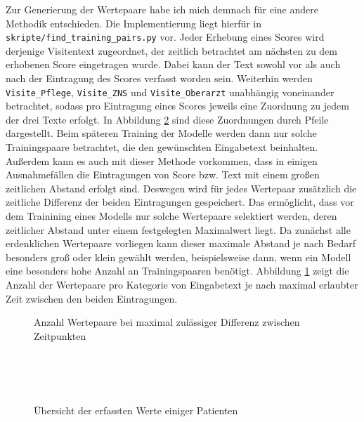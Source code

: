 Zur Generierung der Wertepaare habe ich mich demnach für eine andere Methodik entschieden. Die Implementierung liegt hierfür in \texttt{skripte/find\_training\_pairs.py} vor. Jeder Erhebung eines Scores wird derjenige Visitentext zugeordnet, der zeitlich betrachtet am nächsten zu dem erhobenen Score eingetragen wurde. Dabei kann der Text sowohl vor als auch nach der Eintragung des Scores verfasst worden sein. Weiterhin werden \texttt{Visite\_Pflege}, \texttt{Visite\_ZNS} und \texttt{Visite\_Oberarzt} unabhängig voneinander betrachtet, sodass pro Eintragung eines Scores jeweils eine Zuordnung zu jedem der drei Texte erfolgt. In Abbildung \ref{fig:pat_example_scatterplots} sind diese Zuordnungen durch Pfeile dargestellt. Beim späteren Training der Modelle werden dann nur solche Trainingspaare betrachtet, die den gewünschten Eingabetext beinhalten. Außerdem kann es auch mit dieser Methode vorkommen, dass in einigen Ausnahmefällen die Eintragungen von Score bzw. Text mit einem großen zeitlichen Abstand erfolgt sind. Deswegen wird für jedes Wertepaar zusätzlich die zeitliche Differenz der beiden Eintragungen gespeichert. Das ermöglicht, dass vor dem Trainining eines Modells nur solche Wertepaare selektiert werden, deren zeitlicher Abstand unter einem festgelegten Maximalwert liegt. Da zunächst alle erdenklichen Wertepaare vorliegen kann dieser maximale Abstand je nach Bedarf besonders groß oder klein gewählt werden, beispielsweise dann, wenn ein Modell eine besonders hohe Anzahl an Trainingspaaren benötigt. Abbildung \ref{fig:n_pairs_by_max_offset} zeigt die Anzahl der Wertepaare pro Kategorie von Eingabetext je nach maximal erlaubter Zeit zwischen den beiden Eintragungen.

\begin{figure}[htp]
    \captionsetup{justification=centering}
    \centering
    \quad
    \caption{Anzahl Wertepaare bei maximal zulässiger Differenz zwischen \mbox{Zeitpunkten}}
    \label{fig:n_pairs_by_max_offset}
\end{figure}

\begin{figure}[p]
    \centering
     \\
     \\
     \\
    \caption{Übersicht der erfassten Werte einiger Patienten}
    \label{fig:pat_example_scatterplots}
\end{figure}

